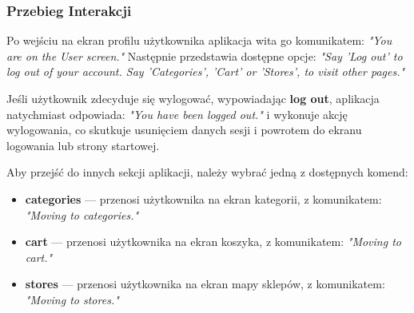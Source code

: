 \subsubsection{Przebieg Interakcji}
Po wejściu na ekran profilu użytkownika aplikacja wita go komunikatem: \textit{"You are on the User screen."} Następnie przedstawia dostępne opcje: \textit{"Say 'Log out' to log out of your account. Say 'Categories', 'Cart' or 'Stores', to visit other pages."}

Jeśli użytkownik zdecyduje się wylogować, wypowiadając \textbf{log out}, aplikacja natychmiast odpowiada: \textit{"You have been logged out."} i wykonuje akcję wylogowania, co skutkuje usunięciem danych sesji i powrotem do ekranu logowania lub strony startowej.

Aby przejść do innych sekcji aplikacji, należy wybrać jedną z dostępnych komend:
\begin{itemize}
    \item \textbf{categories} — przenosi użytkownika na ekran kategorii, z komunikatem: \textit{"Moving to categories."}
    \item \textbf{cart} — przenosi użytkownika na ekran koszyka, z komunikatem: \textit{"Moving to cart."}
    \item \textbf{stores} — przenosi użytkownika na ekran mapy sklepów, z komunikatem: \textit{"Moving to stores."}
\end{itemize}
